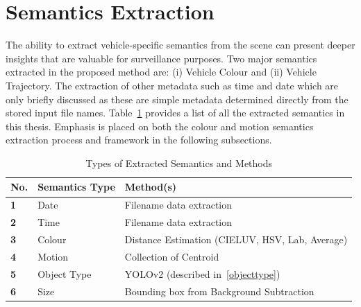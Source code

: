 \section{Semantics Extraction}
\label{section:semanticsExtraction}

The ability to extract vehicle-specific semantics from the scene can present deeper insights that are valuable for surveillance purposes.
Two major semantics extracted in the proposed method are: (i) Vehicle Colour and (ii) Vehicle Trajectory. The extraction of other metadata such as time and date which are only briefly discussed as these are simple metadata determined directly from the stored input file names.
Table~\ref{table:semantics} provides a list of all the extracted semantics in this thesis.
Emphasis is placed on both the colour and motion semantics extraction process and framework in the following subsections.

\begin{table} \centering
\caption {Types of Extracted Semantics and Methods}
\label{table:semantics}
\begin{tabular}{|l|l|l|}
\hline
\textbf{No.} & \textbf{Semantics Type} & \textbf{Method(s)}                                                                                                          \\ \hline
\textbf{1}   & Date                    & Filename data extraction                                                                                                         \\ \hline
\textbf{2}   & Time                    & Filename data extraction                                                                                                         \\ \hline
\textbf{3}   & Colour                   & 
Distance Estimation (CIELUV, HSV, Lab, Average)
\\ \hline
\textbf{4}   & Motion                  & 
Collection of Centroid 
\\ \hline
\textbf{5}   & Object Type             & YOLOv2 (described in~\ref{objecttype})                                                                                                               \\ \hline
\textbf{6}   & Size                    & Bounding box from Background Subtraction                                                                                                      \\ \hline
\end{tabular}

\end{table}

